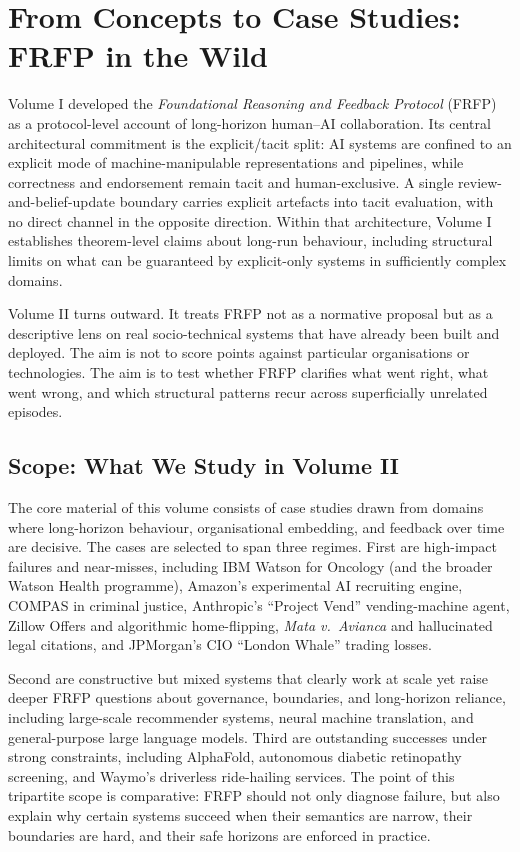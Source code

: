 \chapter{From Concepts to Case Studies: FRFP in the Wild}

Volume I developed the \emph{Foundational Reasoning and Feedback Protocol} (FRFP) as a protocol-level account of long-horizon human--AI collaboration. Its central architectural commitment is the explicit/tacit split: AI systems are confined to an explicit mode of machine-manipulable representations and pipelines, while correctness and endorsement remain tacit and human-exclusive. A single review-and-belief-update boundary carries explicit artefacts into tacit evaluation, with no direct channel in the opposite direction. Within that architecture, Volume I establishes theorem-level claims about long-run behaviour, including structural limits on what can be guaranteed by explicit-only systems in sufficiently complex domains.

Volume II turns outward. It treats FRFP not as a normative proposal but as a descriptive lens on real socio-technical systems that have already been built and deployed. The aim is not to score points against particular organisations or technologies. The aim is to test whether FRFP clarifies what went right, what went wrong, and which structural patterns recur across superficially unrelated episodes.

\section{Scope: What We Study in Volume II}

The core material of this volume consists of case studies drawn from domains where long-horizon behaviour, organisational embedding, and feedback over time are decisive. The cases are selected to span three regimes. First are high-impact failures and near-misses, including IBM Watson for Oncology (and the broader Watson Health programme), Amazon’s experimental AI recruiting engine, COMPAS in criminal justice, Anthropic’s ``Project Vend'' vending-machine agent, Zillow Offers and algorithmic home-flipping, \emph{Mata v.~Avianca} and hallucinated legal citations, and JPMorgan’s CIO ``London Whale'' trading losses.

Second are constructive but mixed systems that clearly work at scale yet raise deeper FRFP questions about governance, boundaries, and long-horizon reliance, including large-scale recommender systems, neural machine translation, and general-purpose large language models. Third are outstanding successes under strong constraints, including AlphaFold, autonomous diabetic retinopathy screening, and Waymo’s driverless ride-hailing services. The point of this tripartite scope is comparative: FRFP should not only diagnose failure, but also explain why certain systems succeed when their semantics are narrow, their boundaries are hard, and their safe horizons are enforced in practice.

